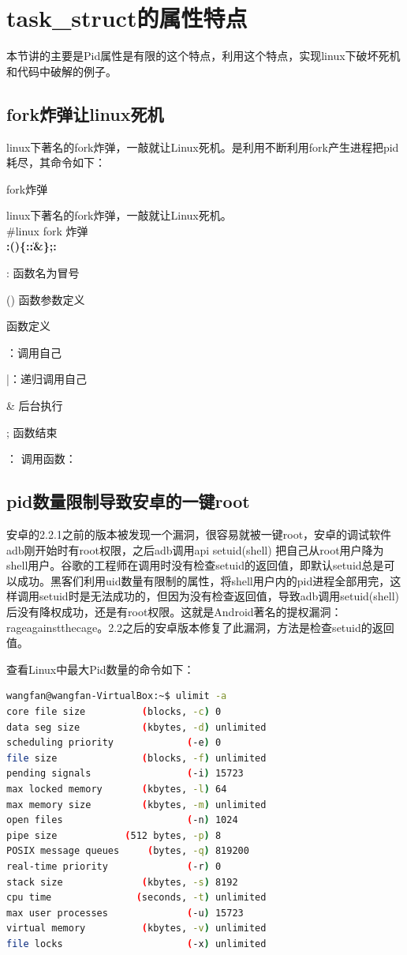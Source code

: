 \section{task\_struct的属性特点}
本节讲的主要是Pid属性是有限的这个特点，利用这个特点，实现linux下破坏死机和代码中破解的例子。
\subsection{fork炸弹让linux死机}
linux下著名的fork炸弹，一敲就让Linux死机。是利用不断利用fork产生进程把pid耗尽，其命令如下：
\begin{example*}
  \wdexpbox
  {\caption{fork炸弹}}
  {linux下著名的fork炸弹，一敲就让Linux死机。\\
  \textcolor[rgb]{1.00,0.00,0.00}{\#linux fork 炸弹}\\  
  \textcolor[rgb]{1.00,0.00,0.00}{\textbf{:()\{:\|:\&\};: } }
  }
\end{example*}

\begin{latexcmd}[label=linux fork 炸弹解析]
: 函数名为冒号

() 函数参数定义

{} 函数定义

：调用自己

|：递归调用自己

& 后台执行

; 函数结束

： 调用函数：
\end{latexcmd}

\subsection{pid数量限制导致安卓的一键root}
安卓的2.2.1之前的版本被发现一个漏洞，很容易就被一键root，安卓的调试软件adb刚开始时有root权限，之后adb调用api setuid(shell) 把自己从root用户降为shell用户。谷歌的工程师在调用时没有检查setuid的返回值，即默认setuid总是可以成功。黑客们利用uid数量有限制的属性，将shell用户内的pid进程全部用完，这样调用setuid时是无法成功的，但因为没有检查返回值，导致adb调用setuid(shell) 后没有降权成功，还是有root权限。这就是Android著名的提权漏洞：rageagainstthecage。2.2之后的安卓版本修复了此漏洞，方法是检查setuid的返回值。

查看Linux中最大Pid数量的命令如下：
\begin{lstlisting}[language={bash}]
wangfan@wangfan-VirtualBox:~$ ulimit -a
core file size          (blocks, -c) 0
data seg size           (kbytes, -d) unlimited
scheduling priority             (-e) 0
file size               (blocks, -f) unlimited
pending signals                 (-i) 15723
max locked memory       (kbytes, -l) 64
max memory size         (kbytes, -m) unlimited
open files                      (-n) 1024
pipe size            (512 bytes, -p) 8
POSIX message queues     (bytes, -q) 819200
real-time priority              (-r) 0
stack size              (kbytes, -s) 8192
cpu time               (seconds, -t) unlimited
max user processes              (-u) 15723
virtual memory          (kbytes, -v) unlimited
file locks                      (-x) unlimited
\end{lstlisting}


